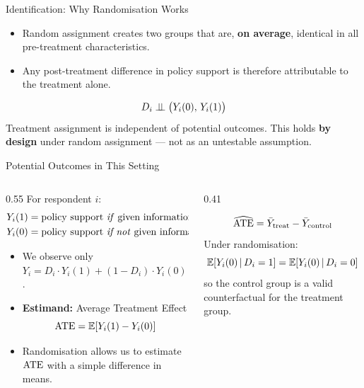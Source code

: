 \documentclass[aspectratio=169, 11pt]{beamer}
\begin{document}
\begin{frame}[t]{Identification: Why Randomisation Works}
\begin{itemize}
  \setlength\itemsep{0.5em}
  \item Random assignment creates two groups that are, \textbf{on average}, identical in all pre-treatment characteristics.
  \item Any post-treatment difference in policy support is therefore attributable to the treatment alone.
\end{itemize}
\vspace{0.3em}
\begin{keybox}
\[
  D_i \perp\!\!\!\perp \bigl(Y_i(0),\, Y_i(1)\bigr)
\]
Treatment assignment is independent of potential outcomes.
This holds \textbf{by design} under random assignment — not as an untestable assumption.
\end{keybox}
\vspace{0.3em}
\end{frame}


\begin{frame}[t]{Potential Outcomes in This Setting}
\begin{columns}[T]
\begin{column}{0.55\textwidth}
For respondent $i$:
\begin{align*}
  Y_i(1) &= \text{policy support \emph{if} given information} \\
  Y_i(0) &= \text{policy support \emph{if not} given information}
\end{align*}
\begin{itemize}
  \setlength\itemsep{0.4em}
  \item We observe only $Y_i = D_i \cdot Y_i(1) + (1-D_i) \cdot Y_i(0)$.
  \item \textbf{Estimand:} Average Treatment Effect
    \[
      \mathrm{ATE} = \mathbb{E}\!\left[Y_i(1) - Y_i(0)\right]
    \]
  \item Randomisation allows us to estimate $\mathrm{ATE}$ with a simple difference in means.
\end{itemize}
\end{column}
\begin{column}{0.41\textwidth}
\begin{intuitionbox}
\[
  \widehat{\mathrm{ATE}} = \bar{Y}_{\mathrm{treat}} - \bar{Y}_{\mathrm{control}}
\]
Under randomisation:
\[
\mathbb{E}\!\left[Y_i(0)\,\middle|\,D_i=1\right] = \mathbb{E}\!\left[Y_i(0)\,\middle|\,D_i=0\right]
\]
so the control group is a valid counterfactual for the treatment group.
\end{intuitionbox}
\end{column}
\end{columns}
\end{frame}
\end{document}
